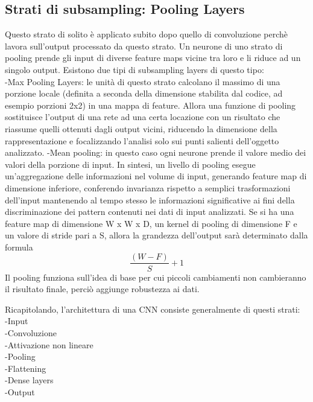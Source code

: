 \subsection{Strati di subsampling: Pooling Layers}
Questo strato di solito è applicato subito dopo quello di convoluzione perchè lavora sull’output processato da questo strato. Un neurone di uno strato di pooling prende gli input di diverse feature maps vicine tra loro e li riduce ad un singolo output. 
Esistono due tipi di subsampling layers di questo tipo:\\
-Max Pooling Layers: le unità di questo strato calcolano il massimo di una porzione locale (definita a seconda della dimensione stabilita dal codice, ad esempio porzioni 2x2) in una mappa di feature. Allora una funzione di pooling sostituisce l’output di una rete ad una certa locazione con un risultato che riassume quelli ottenuti dagli output vicini, riducendo la dimensione della rappresentazione e focalizzando l’analisi solo sui punti salienti dell’oggetto analizzato. 
-Mean pooling: in questo caso ogni neurone prende il valore medio dei valori della porzione di input. In sintesi, un livello di pooling esegue un’aggregazione delle informazioni nel volume di input, generando feature map di dimensione inferiore, conferendo invarianza rispetto a semplici trasformazioni dell’input mantenendo al tempo stesso
le informazioni significative ai fini della discriminazione dei pattern contenuti nei dati di input analizzati.
Se si ha una feature map di dimensione W x W x D, un kernel di pooling di dimensione F e un valore di stride pari a S, allora la grandezza dell’output sarà determinato dalla formula 
\[\frac{(W-F)}{S}+1\]
Il pooling funziona sull’idea di base per cui piccoli cambiamenti non cambieranno il risultato finale, perciò aggiunge robustezza ai dati. 


Ricapitolando, l’architettura di una CNN consiste generalmente di questi strati: \\
-Input\\
-Convoluzione \\
-Attivazione non lineare\\
-Pooling \\
-Flattening\\
-Dense layers\\
-Output\\



